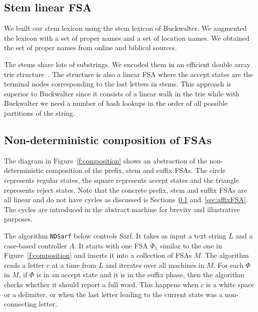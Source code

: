 \documentclass[11pt,letterpaper]{article}
\newcommand{\CodeIn}[1]{{\small\texttt{#1}}}
\begin{document}
\subsection{Stem linear FSA}
\label{sec:stemFSA}

We built our stem lexicon using the stem lexicon of 
Buckwalter. 
We augmented the lexicon with a set of proper names and
a set of location names. 
We obtained the set of proper names from online 
and biblical sources. 

The stems share lots of substrings. We encoded them in
an efficient double array trie structure~\cite{Aoe:89}. 
The structure is also a linear FSA where the accept
states are the terminal nodes corresponding to the last 
letters in stems. 
This approach is superior to Buckwalter since it consists of
a linear walk in the trie while with Buckwalter we need
a number of hash lookups in the order of all possible partitions
of the string.

\subsection{Non-deterministic composition of FSAs}
\label{sec:ndfsa}

The diagram in Figure~\ref{f:composition} shows an 
abstraction of the non-deterministic composition 
of the prefix, stem and suffix FSAs. 
The circle represents regular states, the square
represents accept states and the triangle represents
reject states. 
Note that the concrete prefix, stem and suffix FSAs
are all linear and do not have cycles as discussed 
is Sections~\ref{sec:stemFSA} and~\ref{sec:affixFSA}.
The cycles are introduced in the abstract machine
for brevity and illustrative purposes.

\begin{figure*}[tb]
\end{figure*}

The algorithm \CodeIn{NDSarf} below controls Sarf. 
It takes as input a text string $L$ and a case-based controller
$A$. 
It starts with one FSA $\Phi_1$ similar to the one in 
Figure~\ref{f:composition} and inserts it into a collection
of FSAs $M$. 
The algorithm reads a letter $c$ at a time from $L$
and iterates over all machines in $M$. 
For each $\Phi$ in $M$,
if $\Phi$ is in an accept state and it is in the suffix
phase, then the algorithm checks whether it should report
a full word. 
This happens when $c$ is a white space or a delimiter, 
or when the last letter leading to the current state
was a non-connecting letter. 
\end{document}

